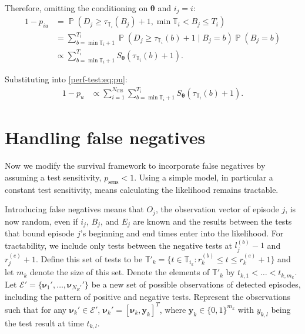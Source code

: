 \documentclass[12pt]{article}
\DeclareMathOperator{\prob}{\mathbb{P}}
\newcommand\set{\mathcal}
\renewcommand{\vec}[1]{\bm{#1}}
\newcommand{\ssep}{:}
\newcommand{\psens}{p_\text{sens}}
\newcommand{\Ncis}{N_\text{CIS}}
\newcommand{\sched}{\mathbb{T}}
\begin{document}
Therefore, omitting the conditioning on $\vec{\theta}$ and $i_j = i$:
\begin{align}
1 - p_{iu}
&= \prob(D_j \geq \tau_{\sched_{i}}(B_j)+ 1, \min \sched_{i} < B_j \leq T_{i}) \\
&= \sum_{b = \min \sched_{i} + 1}^{T_{i}} \prob(D_j \geq \tau_{\sched_{i}}(b) + 1 \mid B_j = b) \prob(B_j = b)\\
&\propto \sum_{b = \min \sched_{i} + 1}^{T_{i}} S_{\vec{\theta}}(\tau_{\sched_{i}}(b) + 1).
\label{perf-test:eq:piu}
\end{align}

Substituting into \cref{perf-test:eq:pu}:
\begin{align}
1 - p_u
& \propto \sum_{i=1}^{\Ncis} \sum_{b = \min \sched_{i} + 1}^{T_{i}} S_{\vec{\theta}}(\tau_{\sched_{i}}(b) + 1).
\end{align}

\section{Handling false negatives} \label{sec:false-negatives}

Now we modify the survival framework to incorporate false negatives by assuming a test sensitivity, $\psens < 1$.
Using a simple model, in particular a constant test sensitivity, means calculating the likelihood remains tractable.

Introducing false negatives means that $O_j$, the observation vector of episode $j$, is now random, even if $i_j$, $B_j$, and $E_j$ are known and the results between the tests that bound episode $j$'s beginning and end times enter into the likelihood.
For tractability, we include only tests between the negative tests at $l_j^{(b)}-1$ and $r_j^{(e)}+1$. 
Define this set of tests to be $\sched'_k = \{ t \in \sched_{i_k} \ssep r_k^{(b)} \leq t \leq r_k^{(e)} + 1 \}$ and let $m_k$ denote the size of this set.
Denote the elements of $\sched'_k$ by $t_{k,1} < \dots < t_{k,m_k}$.
Let $\set{E}' = \{ \vec{\nu}_1', \dots, \vec{\nu}_{N_E'}' \}$ be a new set of possible observations of detected episodes, including the pattern of positive and negative tests.
Represent the observations such that for any $\vec{\nu}_k' \in \set{E}'$, $\vec{\nu}_k' = [\vec{\nu}_{k}, \vec{y}_k]^T$, where $\vec{y}_k \in \{ 0, 1 \}^{m_k}$ with $y_{k,l}$ being the test result at time $t_{k,l}$.
\end{document}
